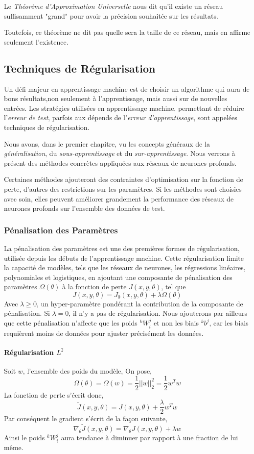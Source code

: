 \documentclass[a4paper, 11pt]{report}
\newcommand{\lexp}[1]{\phantom{}^{#1}}
\newcommand{\elem}[4]{\lexp{#2}#1^{#3}_{#4}}
\begin{document}
Le \emph{Théorème d'Approximation Universelle} nous dit qu'il existe un réseau suffisamment "grand" pour avoir la précision souhaitée sur les résultats.

Toutefois, ce théorème ne dit pas quelle sera la taille de ce réseau, mais en affirme seulement l'existence.
\subsection{Techniques de Régularisation}
Un défi majeur en apprentissage machine est de choisir un algorithme qui aura de bons résultats,non seulement à l'apprentissage, mais aussi sur de nouvelles entrées.
Les stratégies utilisées en apprentissage machine, permettant de réduire l'\emph{erreur de test}, parfois aux dépends de l'\emph{erreur d'apprentissage}, sont appelées techniques de régularisation.

Nous avons, dans le premier chapitre, vu les concepts généraux de la \emph{généralisation}, du \emph{sous-apprentissage} et du \emph{sur-apprentissage}.
Nous verrons à présent des méthodes concrètes appliquées aux réseaux de neurones profonds.

Certaines méthodes ajouteront des contraintes d'optimisation sur la fonction de perte, d'autres des restrictions sur les paramètres.
Si les méthodes sont choisies avec soin, elles peuvent améliorer grandement la performance des réseaux de neurones profonds sur l'ensemble des données de test.
\subsubsection{Pénalisation des Paramètres}
La pénalisation des paramètres est une des premières formes de régularisation, utilisée depuis les débuts de l'apprentissage machine.
Cette régularisation limite la capacité de modèles, tels que les réseaux de neurones, les régressions linéaires, polynomiales et logistiques, en ajoutant une composante de pénalisation des paramètres $\Omega(\theta)$ à la fonction de perte $J(x,y,\theta)$, tel que
$$J(x,y,\theta) = J_0(x,y,\theta) + \lambda \Omega(\theta)$$
Avec $\lambda \geq 0$, un hyper-paramètre pondérant la contribution de la composante de pénalisation.
Si $\lambda = 0$, il n'y a pas de régularisation.
Nous ajouterons par ailleurs que cette pénalisation n'affecte que les poids $\elem{W}{k}{j}{i}$ et non les biais $\elem{b}{k}{j}{}$, car les biais requièrent moins de données pour ajuster précisément les données.
\paragraph{Régularisation $L^2$}
Soit $w$, l'ensemble des poids du modèle,
On pose, $$\Omega(\theta) = \Omega(w) = \frac{1}{2} ||w||_2^2 = \frac{1}{2} w^T w$$
La fonction de perte s'écrit donc,
$$\tilde{J}(x,y,\theta) = J(x,y,\theta) + \frac{\lambda}{2} w^T w$$
Par conséquent le gradient s'écrit de la façon suivante,
$$\nabla_\theta \tilde{J}(x,y,\theta) = \nabla_\theta J(x,y,\theta) + \lambda w$$
Ainsi le poids $\elem{W}{k}{j}{i}$ aura tendance à diminuer par rapport à une fraction de lui même.
\end{document}
